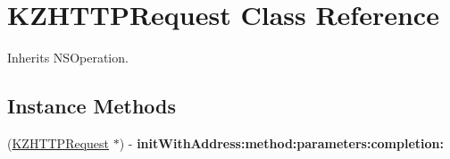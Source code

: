 \hypertarget{interface_k_z_h_t_t_p_request}{\section{K\-Z\-H\-T\-T\-P\-Request Class Reference}
\label{interface_k_z_h_t_t_p_request}
}


Inherits N\-S\-Operation.

\subsection*{Instance Methods}
\begin{DoxyCompactItemize}
\item 
\hypertarget{interface_k_z_h_t_t_p_request_a0a32bf10987d8273eda8050e6f6a274c}{(\hyperlink{interface_k_z_h_t_t_p_request}{K\-Z\-H\-T\-T\-P\-Request} $\ast$) -\/ {\bfseries init\-With\-Address\-:method\-:parameters\-:completion\-:}}\label{interface_k_z_h_t_t_p_request_a0a32bf10987d8273eda8050e6f6a274c}

\end{DoxyCompactItemize}
